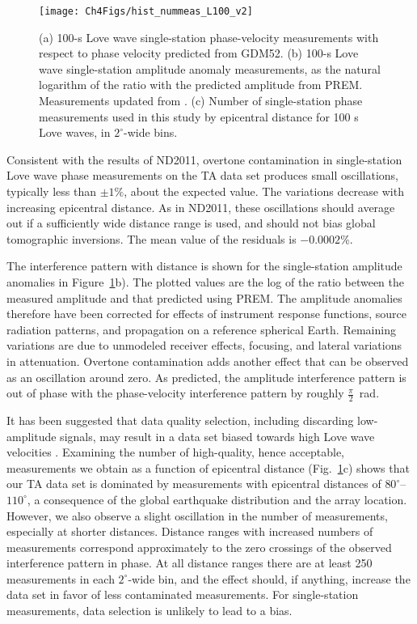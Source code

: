 \documentclass[12pt,oneside]{book}
\newcommand{\degree}[1]{\mbox{$#1^{\circ}$}}
\begin{document}
\begin{figure} 
\begin{center}
\texttt{[image: Ch4Figs/hist\_nummeas\_L100\_v2]} 
\caption[Overtone interference in single-station phase-velocity and amplitude measurements]{(a) 100-s Love wave single-station phase-velocity measurements with respect to phase velocity predicted from GDM52. (b) 100-s Love wave single-station amplitude anomaly measurements, as the natural logarithm of the ratio with the predicted amplitude from PREM. Measurements updated from \citet{EddyEkstrom2014}. (c) Number of single-station phase measurements used in this study by epicentral distance for 100 s Love waves, in \degree{2}-wide bins. }
\label{figot:dETL}
\end{center}
\end{figure}
%

Consistent with the results of ND2011, overtone contamination in single-station Love wave phase measurements on the TA data set produces small oscillations, typically less than $\pm1\%$, about the expected value. The variations decrease with increasing epicentral distance. As in ND2011, these oscillations should average out if a sufficiently wide distance range is used, and should not bias global tomographic inversions. The mean value of the residuals is $-0.0002$\%. 

The interference pattern with distance is shown for the single-station amplitude anomalies in Figure~\ref{figot:dETL}b). The plotted values are the log of the ratio between the measured amplitude and that predicted using PREM. The amplitude anomalies therefore have been corrected for effects of instrument response functions, source radiation patterns, and propagation on a reference spherical Earth. Remaining variations are due to unmodeled receiver effects, focusing, and lateral variations in attenuation. Overtone contamination adds another effect that can be observed as an oscillation around zero. As predicted, the amplitude interference pattern is out of phase with the phase-velocity interference pattern by roughly $\frac{\pi}{2}$~rad. 

It has been suggested that data quality selection, including discarding low-amplitude signals, may result in a data set biased towards high Love wave velocities \citep{Thatcher&Brune1969}. Examining the number of high-quality, hence acceptable, measurements we obtain as a function of epicentral distance (Fig.~\ref{figot:dETL}c) shows that our TA data set is dominated by measurements with epicentral distances of \degree{80}--\degree{110}, a consequence of the global earthquake distribution and the array location. However, we also observe a slight oscillation in the number of measurements, especially  at shorter distances. Distance ranges with increased numbers of measurements correspond approximately to the zero crossings of the observed interference pattern in phase. At all distance ranges there are at least 250 measurements in each \degree{2}-wide bin, and the effect should, if anything, increase the data set in favor of less contaminated measurements. For single-station measurements, data selection is unlikely to lead to a bias.
\end{document}
